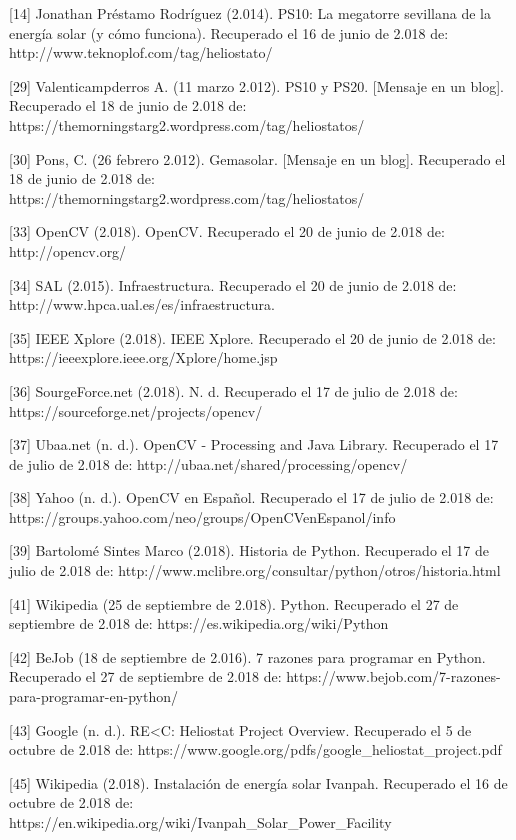 \documentclass[12pt]{article}
\begin{document}
[14] Jonathan Préstamo Rodríguez (2.014). PS10: La megatorre sevillana de la energía solar (y cómo funciona). Recuperado el 16 de junio de 2.018 de: http://www.teknoplof.com/tag/heliostato/

[29] Valenticampderros A. (11 marzo 2.012). PS10 y PS20. [Mensaje en un blog]. Recuperado el 18 de junio de 2.018 de: https://themorningstarg2.wordpress.com/tag/heliostatos/

[30] Pons, C. (26 febrero 2.012). Gemasolar. [Mensaje en un blog]. Recuperado el 18 de junio de 2.018 de: https://themorningstarg2.wordpress.com/tag/heliostatos/

[33] OpenCV (2.018). OpenCV. Recuperado el 20 de junio de 2.018 de: http://opencv.org/

[34] SAL (2.015). Infraestructura. Recuperado el 20 de junio de 2.018 de: http://www.hpca.ual.es/es/infraestructura.

[35] IEEE Xplore (2.018). IEEE Xplore. Recuperado el 20 de junio de 2.018 de: https://ieeexplore.ieee.org/Xplore/home.jsp

[36] SourgeForce.net (2.018). N. d. Recuperado el 17 de julio de 2.018 de: https://sourceforge.net/projects/opencv/

[37] Ubaa.net (n. d.). OpenCV - Processing and Java Library. Recuperado el 17 de julio de 2.018 de: http://ubaa.net/shared/processing/opencv/

[38] Yahoo (n. d.). OpenCV en Español. Recuperado el 17 de julio de 2.018 de: https://groups.yahoo.com/neo/groups/OpenCVenEspanol/info

[39] Bartolomé Sintes Marco (2.018). Historia de Python. Recuperado el 17 de julio de 2.018 de: http://www.mclibre.org/consultar/python/otros/historia.html

[41] Wikipedia (25 de septiembre de 2.018). Python. Recuperado el 27 de septiembre de 2.018 de: https://es.wikipedia.org/wiki/Python

[42] BeJob (18 de septiembre de 2.016). 7 razones para programar en Python. Recuperado el 27 de septiembre de 2.018 de: https://www.bejob.com/7-razones-para-programar-en-python/

[43] Google (n. d.). RE<C: Heliostat Project Overview. Recuperado el 5 de octubre de 2.018 de: https://www.google.org/pdfs/google\_heliostat\_project.pdf

[45] Wikipedia (2.018). Instalación de energía solar Ivanpah. Recuperado el 16 de octubre de 2.018 de: https://en.wikipedia.org/wiki/Ivanpah\_Solar\_Power\_Facility
\end{document}
